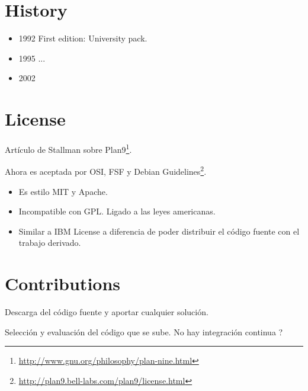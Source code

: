 \documentclass[11pt]{scrartcl}
\begin{document}
\section{History}
\label{sec:history}

\begin{itemize}
	\item 1992 First edition: University pack.
	\item 1995 ...
	\item 2002
\end{itemize}

\section{License}
\label{sec:license}

Artículo de Stallman sobre Plan9\footnote{\url{http://www.gnu.org/philosophy/plan-nine.html}}.

\par Ahora es aceptada por OSI, FSF y Debian Guidelines\footnote{\url{http://plan9.bell-labs.com/plan9/license.html}}. 

\begin{itemize}
	\item Es estilo MIT y Apache.
	\item Incompatible con GPL. Ligado a las leyes americanas.
	\item Similar a IBM License a diferencia de poder distribuir el código fuente con el trabajo derivado.
\end{itemize}


\section{Contributions}
\label{sec:contributions}

\par Descarga del código fuente y aportar cualquier solución.

\par Selección y evaluación del código que se sube. No hay integración continua ?

\end{document}
